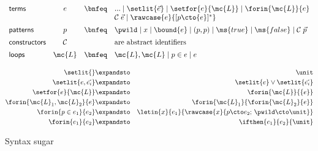 \begin{figure}
  \[\begin{array}{lccl}
  \textsf{terms} &
  e &\bnfeq& ... \pipe \setlit{\vec{e}}
             \pipe \setfor{e}{\mc{L}}
             \pipe \forin{\mc{L}}{e}\\
  &&& \mathcal{C}\;\vec{e} \pipe \rawcase{e}{[{p} \cto {e}]^*}
  \vspace{0.5em}\\
  \textsf{patterns} &
  p &\bnfeq& \pwild \pipe x \pipe \bound{e} \pipe (p,p)
             \pipe \ms{true} \pipe \ms{false} \pipe \mathcal{C}\;\vec{p}
  \vspace{0.5em}\\
  \textsf{constructors} & \mathcal{C} && \text{are abstract identifiers}
  \vspace{0.5em}\\
  \textsf{loops} &
  \mc{L} &\bnfeq& \mc{L}, \mc{L} \pipe p \in e \pipe e
  \end{array}\]

  \begin{eqnarray*}
    \setlit{} &\expandsto& \unit\\
    \setlit{e,\vec{e_i}} &\expandsto& \setlit{e} \vee \setlit{\vec{e_i}}\\
    \setfor{e}{\mc{L}}       &\expandsto& \forin{\mc{L}}{\{e\}}\\
    \forin{\mc{L}_1,\mc{L}_2}{e}
    &\expandsto& \forin{\mc{L}_1}{\forin{\mc{L}_2}{e}}\\
    \forin{p\in e_1}{e_2} &\expandsto&
    \letin{x}{e_1}{\rawcase{x}{p \cto e_2;\,\pwild \cto \unit}}\\
    \forin{e_1}{e_2} &\expandsto& \ifthen{e_1}{e_2}{\unit}
  \end{eqnarray*}
  \caption{Syntax sugar}
  \label{fig:sugar}
\end{figure}

